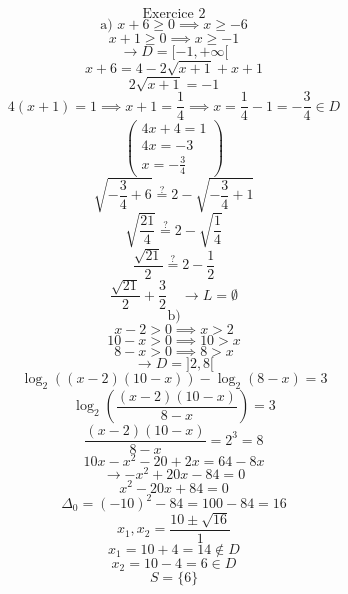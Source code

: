 \documentclass{article}
\begin{document}
\[ \text{Exercice 2} \]
\[ \text{a) } x+6 \ge 0 \implies x \ge -6 \]
\[ x+1 \ge 0 \implies x \ge -1 \]
\[ \to D = [-1, +\infty[ \]
\[ x+6 = 4 - 2\sqrt{x+1} + x + 1 \]
\[ 2\sqrt{x+1} = -1 \]
\[ 4(x+1) = 1 \implies x+1 = \frac{1}{4} \implies x = \frac{1}{4} - 1 = -\frac{3}{4} \in D\]
\[ \left( \begin{array}{c} 4x+4=1 \\ 4x = -3 \\x=-\frac{3}{4} \end{array} \right) \]
\[ \sqrt{-\frac{3}{4}+6} \stackrel{?}{=} 2 - \sqrt{-\frac{3}{4}+1} \]
\[ \sqrt{\frac{21}{4}} \stackrel{?}{=} 2 - \sqrt{\frac{1}{4}} \]
\[ \frac{\sqrt{21}}{2} \stackrel{?}{=} 2 - \frac{1}{2} \]
\[ \frac{\sqrt{21}}{2} + \frac{3}{2} \quad \to L = \emptyset \]
\[ \text{b)} \]
\[ x - 2 > 0 \implies x > 2 \]
\[ 10 - x > 0 \implies 10 > x \]
\[ 8 - x > 0 \implies 8 > x \]
\[ \to D = ]2, 8[ \]
\[ \log_2((x-2)(10-x)) - \log_2(8-x) = 3 \]
\[ \log_2\left(\frac{(x-2)(10-x)}{8-x}\right) = 3 \]
\[ \frac{(x-2)(10-x)}{8-x} = 2^3 = 8 \]
\[ 10x - x^2 - 20 + 2x = 64 - 8x \]
\[ \to -x^2 + 20x - 84 = 0 \]
\[ x^2 - 20x + 84 = 0 \]
\[ \Delta_0 = (-10)^2 - 84 = 100 - 84 = 16 \]
\[ x_1, x_2 = \frac{10 \pm \sqrt{16}}{1} \]
\[ x_1 = 10 + 4 = 14 \notin D \]
\[ x_2 = 10 - 4 = 6 \in D \]
\[ S = \{6\} \]
\end{document}
